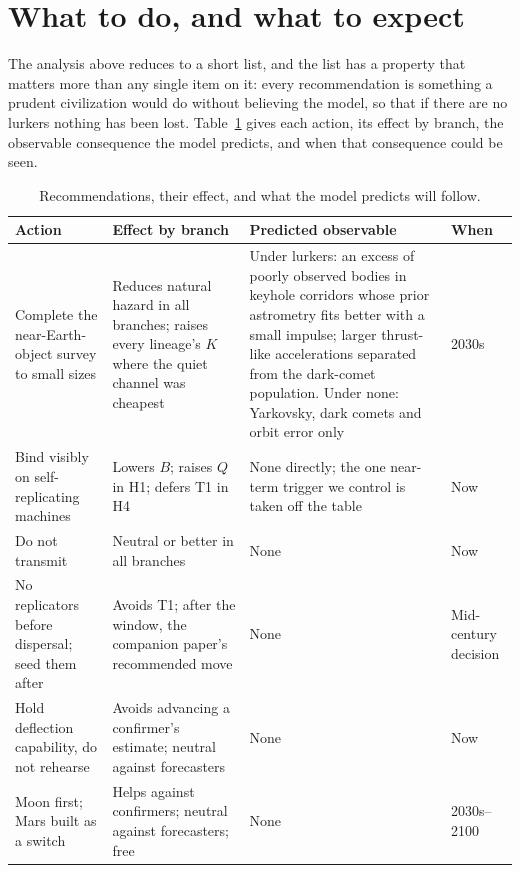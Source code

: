 \documentclass[preprint,12pt]{elsarticle}
\theoremstyle{definition}
\begin{document}
\section{What to do, and what to expect}
\label{sec:recommend}

The analysis above reduces to a short list, and the list has a property that matters more than any single item on it: every recommendation is something a prudent civilization would do without believing the model, so that if there are no lurkers nothing has been lost. Table~\ref{tab:recommend} gives each action, its effect by branch, the observable consequence the model predicts, and when that consequence could be seen.

\begin{table}[!htbp]
\centering
\caption{Recommendations, their effect, and what the model predicts will follow.}
\label{tab:recommend}
\footnotesize
\begin{tabularx}{\textwidth}{@{}>{\raggedright\arraybackslash}p{3.1cm}>{\raggedright\arraybackslash}p{2.6cm}>{\raggedright\arraybackslash}X>{\raggedright\arraybackslash}p{1.9cm}@{}}
\toprule
Action & Effect by branch & Predicted observable & When \\
\midrule
Complete the near-Earth-object survey to small sizes & Reduces natural hazard in all branches; raises every lineage's $K$ where the quiet channel was cheapest & Under lurkers: an excess of poorly observed bodies in keyhole corridors whose prior astrometry fits better with a small impulse; larger thrust-like accelerations separated from the dark-comet population. Under none: Yarkovsky, dark comets and orbit error only & 2030s \\
Bind visibly on self-replicating machines & Lowers $B$; raises $Q$ in H1; defers T1 in H4 & None directly; the one near-term trigger we control is taken off the table & Now \\
Do not transmit & Neutral or better in all branches & None & Now \\
No replicators before dispersal; seed them after & Avoids T1; after the window, the companion paper's recommended move & None & Mid-century decision \\
Hold deflection capability, do not rehearse & Avoids advancing a confirmer's estimate; neutral against forecasters & None & Now \\
Moon first; Mars built as a switch & Helps against confirmers; neutral against forecasters; free & None & 2030s--2100 \\

\end{tabularx}
\end{table}
\end{document}
